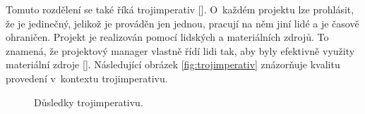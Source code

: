 \documentclass[
	11pt, oneside, printed, final, palatino, monochrome
	microtype,
	table,   %
	lof,     %
	lot     %
]{fithesis3}
\newcommand{\citepages}[2]{[\cite[#1]{#2}]}
\begin{document}
{Tomuto rozdělení se také říká trojimperativ \citepages{5}{rosenau_2000}. O~každém projektu lze prohlásit, že je jedinečný, jelikož je prováděn jen jednou, pracují na něm jiní lidé a je časově ohraničen. Projekt je realizován pomocí lidských a materiálních zdrojů. To znamená, že projektový manager vlastně řídí lidi tak, aby byly efektivně využity materiální zdroje \citepages{28}{rehacek_2013}. Následující obrázek \ref{fig:trojimperativ} znázorňuje kvalitu provedení v~kontextu trojimperativu.

\begin{figure}
    \centering
	\def\svgwidth{1.0\textwidth}
    
	\caption{Důsledky trojimperativu.}
\end{figure}


}
\end{document}
